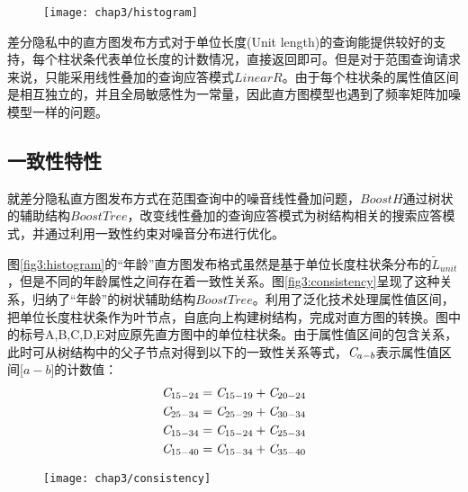 \begin{figure}[!htp]
	\centering
	\texttt{[image: chap3/histogram]}
\end{figure}

差分隐私中的直方图发布方式对于单位长度(Unit length)的查询能提供较好的支持，每个柱状条代表单位长度的计数情况，直接返回即可。但是对于范围查询请求来说，只能采用线性叠加的查询应答模式$LinearR$。由于每个柱状条的属性值区间是相互独立的，并且全局敏感性为一常量，因此直方图模型也遇到了频率矩阵加噪模型一样的问题。

\subsection{一致性特性}
\label{LP_publish}

就差分隐私直方图发布方式在范围查询中的噪音线性叠加问题，$BoostH$通过树状的辅助结构$BoostTree$，改变线性叠加的查询应答模式为树结构相关的搜索应答模式，并通过利用一致性约束对噪音分布进行优化。

图\ref{fig3:histogram}的“年龄”直方图发布格式虽然是基于单位长度柱状条分布的$\tilde{L}_{unit}$，但是不同的年龄属性之间存在着一致性关系。图\ref{fig3:consistency}呈现了这种关系，归纳了“年龄”的树状辅助结构$BoostTree$。利用了泛化技术处理属性值区间，把单位长度柱状条作为叶节点，自底向上构建树结构，完成对直方图的转换。图中的标号A,B,C,D,E对应原先直方图中的单位柱状条。由于属性值区间的包含关系，此时可从树结构中的父子节点对得到以下的一致性关系等式，${\it{C}}_{a-b}$表示属性值区间[$a-b$]的计数值：
\begin{equation}
\label{consistent_equal}
\begin{split}
&{\it{C}}_{15-24} = {\it{C}}_{15-19}+{\it{C}}_{20-24}\\
&{\it{C}}_{25-34} = {\it{C}}_{25-29}+{\it{C}}_{30-34}\\
&{\it{C}}_{15-34} = {\it{C}}_{15-24}+{\it{C}}_{25-34}\\
&{\it{C}}_{15-40} = {\it{C}}_{15-34}+{\it{C}}_{35-40}
\end{split}
\end{equation}

\begin{figure}[!htp]
	\centering
	\texttt{[image: chap3/consistency]}
\end{figure}

